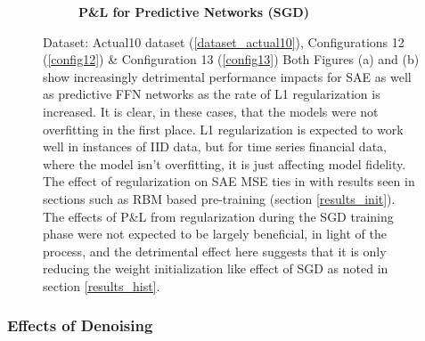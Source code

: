 \documentclass[a4paper,11pt,oneside]{article}
\theoremstyle{plain}
\theoremstyle{definition}
\begin{document}
\begin{figure}[H]
\begin{subfigure}{.5\textwidth}
		\caption{\textbf{P\&L for Predictive Networks (SGD)} 
			\newline }
		\label{figure-actual_pl_reg}
	\end{subfigure}
	\caption[Effects of L1 Regularization (Actual Data)]{Dataset: Actual10 dataset (\ref{dataset_actual10}),  Configurations 12 (\ref{config12}) \& Configuration 13 (\ref{config13})
		\newline Both Figures (a) and (b) show increasingly detrimental performance impacts for SAE as well as predictive FFN networks as the rate of L1 regularization is increased. It is clear, in these cases, that the models were not overfitting in the first place. L1 regularization is expected to work well in instances of IID data, but for time series financial data, where the model isn't overfitting, it is just affecting model fidelity. The effect of regularization on SAE MSE ties in with results seen in sections such as RBM based pre-training (section \ref{results_init}). The effects of P\&L from regularization during the SGD training phase were not expected to be largely beneficial, in light of the process, and the detrimental effect here suggests that it is only reducing the weight initialization like effect of SGD as noted in section \ref{results_hist}.}
	\label{figure-results-reg}
\end{figure}

\subsubsection{Effects of Denoising}
\end{document}
